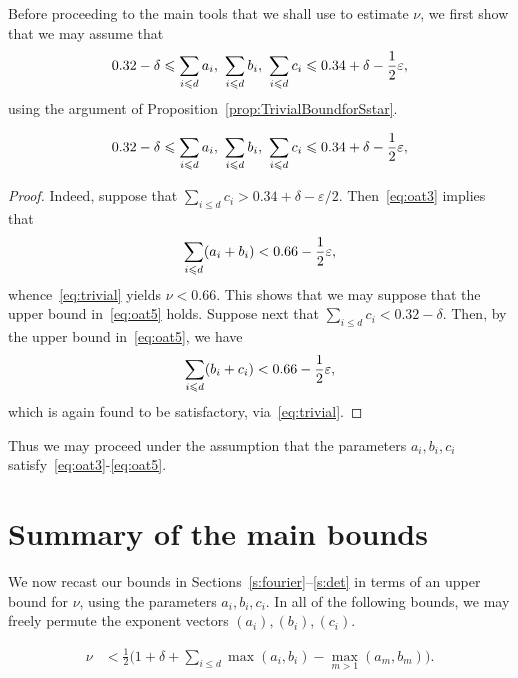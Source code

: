 Before proceeding to the main tools that we shall use to estimate $\nu$, we first show that we may assume that
\begin{equation*}
0.32 - \delta \leqslant \sum_{i\leqslant d} a_i ,~ \sum_{i\leqslant d} b_i ,~ \sum_{i\leqslant d} c_i \leqslant 0.34 + \delta- \frac{1}{2}\varepsilon,
\end{equation*}
using the argument of Proposition~\ref{prop:TrivialBoundforSstar}.
\begin{proposition}\label{prop:Eqn4Point5}
  \begin{equation}\label{eq:oat5}
    0.32 - \delta \leqslant \sum_{i\leqslant d} a_i ,~ \sum_{i\leqslant d} b_i ,~ \sum_{i\leqslant d} c_i \leqslant 0.34 + \delta- \frac{1}{2}\varepsilon,
  \end{equation}
\end{proposition}
\begin{proof}
  Indeed, suppose that
  $\sum_{i\leq d} c_i> 0.34 + \delta-\varepsilon/2$.
  Then~\eqref{eq:oat3} implies that
  \[
  \sum_{i\leqslant d} (a_i + b_i)<
  0.66-\frac{1}{2}\varepsilon,
  \]
  whence~\eqref{eq:trivial} yields $\nu< 0.66$. This shows that we may suppose that the upper bound in~\eqref{eq:oat5} holds.
  Suppose next that
  $\sum_{i\leq d} c_i< 0.32 - \delta$. Then, by the upper bound in~\eqref{eq:oat5}, we have
  \[
  \sum_{i\leqslant d} (b_i + c_i)< 0.66-\frac{1}{2}\varepsilon,
  \]
  which is again found to be satisfactory, via~\eqref{eq:trivial}.
\end{proof}

Thus we may proceed under the assumption that the parameters $a_i,b_i,c_i$ satisfy~\eqref{eq:oat3}-\eqref{eq:oat5}.

\section{Summary of the main bounds}

We now recast our bounds in Sections~\ref{s:fourier}--\ref{s:det} in terms of
an upper bound for $\nu$, using
the parameters $a_i,b_i,c_i$.
In all of the following bounds, we may freely permute the exponent vectors $(a_i),(b_i),(c_i)$.

\begin{proposition}\label{prop:FourierBound}
  \begin{align*}
  \nu & < \frac{1}{2}\Big(1+\delta +\sum_{i\leq d} \max(a_i,b_i) - \max_{m>1}(a_m,b_m)\Big).
  \end{align*}
\end{proposition}

